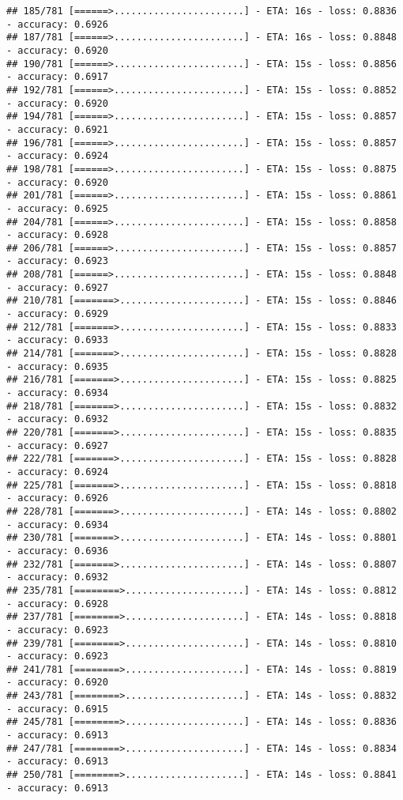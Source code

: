 \documentclass[
]{article}
\begin{document}
\begin{verbatim}
## 185/781 [======>.......................] - ETA: 16s - loss: 0.8836 - accuracy: 0.6926
## 187/781 [======>.......................] - ETA: 16s - loss: 0.8848 - accuracy: 0.6920
## 190/781 [======>.......................] - ETA: 15s - loss: 0.8856 - accuracy: 0.6917
## 192/781 [======>.......................] - ETA: 15s - loss: 0.8852 - accuracy: 0.6920
## 194/781 [======>.......................] - ETA: 15s - loss: 0.8857 - accuracy: 0.6921
## 196/781 [======>.......................] - ETA: 15s - loss: 0.8857 - accuracy: 0.6924
## 198/781 [======>.......................] - ETA: 15s - loss: 0.8875 - accuracy: 0.6920
## 201/781 [======>.......................] - ETA: 15s - loss: 0.8861 - accuracy: 0.6925
## 204/781 [======>.......................] - ETA: 15s - loss: 0.8858 - accuracy: 0.6928
## 206/781 [======>.......................] - ETA: 15s - loss: 0.8857 - accuracy: 0.6923
## 208/781 [======>.......................] - ETA: 15s - loss: 0.8848 - accuracy: 0.6927
## 210/781 [=======>......................] - ETA: 15s - loss: 0.8846 - accuracy: 0.6929
## 212/781 [=======>......................] - ETA: 15s - loss: 0.8833 - accuracy: 0.6933
## 214/781 [=======>......................] - ETA: 15s - loss: 0.8828 - accuracy: 0.6935
## 216/781 [=======>......................] - ETA: 15s - loss: 0.8825 - accuracy: 0.6934
## 218/781 [=======>......................] - ETA: 15s - loss: 0.8832 - accuracy: 0.6932
## 220/781 [=======>......................] - ETA: 15s - loss: 0.8835 - accuracy: 0.6927
## 222/781 [=======>......................] - ETA: 15s - loss: 0.8828 - accuracy: 0.6924
## 225/781 [=======>......................] - ETA: 15s - loss: 0.8818 - accuracy: 0.6926
## 228/781 [=======>......................] - ETA: 14s - loss: 0.8802 - accuracy: 0.6934
## 230/781 [=======>......................] - ETA: 14s - loss: 0.8801 - accuracy: 0.6936
## 232/781 [=======>......................] - ETA: 14s - loss: 0.8807 - accuracy: 0.6932
## 235/781 [========>.....................] - ETA: 14s - loss: 0.8812 - accuracy: 0.6928
## 237/781 [========>.....................] - ETA: 14s - loss: 0.8818 - accuracy: 0.6923
## 239/781 [========>.....................] - ETA: 14s - loss: 0.8810 - accuracy: 0.6923
## 241/781 [========>.....................] - ETA: 14s - loss: 0.8819 - accuracy: 0.6920
## 243/781 [========>.....................] - ETA: 14s - loss: 0.8832 - accuracy: 0.6915
## 245/781 [========>.....................] - ETA: 14s - loss: 0.8836 - accuracy: 0.6913
## 247/781 [========>.....................] - ETA: 14s - loss: 0.8834 - accuracy: 0.6913
## 250/781 [========>.....................] - ETA: 14s - loss: 0.8841 - accuracy: 0.6913

\end{verbatim}
\end{document}
